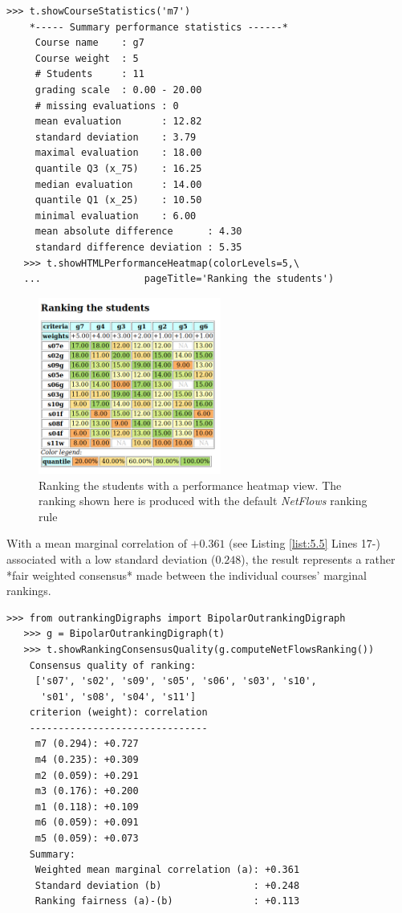 \begin{lstlisting}[caption={Student performance summary statistics per course},label=list:5.6,basicstyle=\footnotesize]
   >>> t.showCourseStatistics('m7')
    *----- Summary performance statistics ------*
     Course name    : g7
     Course weight  : 5
     # Students     : 11
     grading scale  : 0.00 - 20.00
     # missing evaluations : 0
     mean evaluation       : 12.82
     standard deviation    : 3.79
     maximal evaluation    : 18.00
     quantile Q3 (x_75)    : 16.25
     median evaluation     : 14.00
     quantile Q1 (x_25)    : 10.50
     minimal evaluation    : 6.00
     mean absolute difference      : 4.30
     standard difference deviation : 5.35
   >>> t.showHTMLPerformanceHeatmap(colorLevels=5,\
   ...                  pageTitle='Ranking the students')
\end{lstlisting}

\begin{figure}[h]
\sidecaption
\includegraphics[width=6cm]{Figures/rankingStudents.png}
\caption{Ranking the students with a performance heatmap view. The ranking shown here is produced with the default \emph{NetFlows} ranking rule}
\label{fig:5.4}       %
\end{figure}

With a mean marginal correlation of $+0.361$ (see Listing \ref{list:5.5} Lines 17-) associated with a low standard deviation ($0.248$), the result represents a rather *fair weighted consensus* made between the individual courses' marginal rankings.

\begin{lstlisting}[caption={Consensus quality of the students's ranking},label=list:5.7,basicstyle=\footnotesize]
   >>> from outrankingDigraphs import BipolarOutrankingDigraph
   >>> g = BipolarOutrankingDigraph(t)
   >>> t.showRankingConsensusQuality(g.computeNetFlowsRanking())
    Consensus quality of ranking:
     ['s07', 's02', 's09', 's05', 's06', 's03', 's10',
      's01', 's08', 's04', 's11']
    criterion (weight): correlation
    -------------------------------
     m7 (0.294): +0.727
     m4 (0.235): +0.309
     m2 (0.059): +0.291
     m3 (0.176): +0.200
     m1 (0.118): +0.109
     m6 (0.059): +0.091
     m5 (0.059): +0.073
    Summary:
     Weighted mean marginal correlation (a): +0.361
     Standard deviation (b)                : +0.248
     Ranking fairness (a)-(b)              : +0.113
\end{lstlisting}
   
